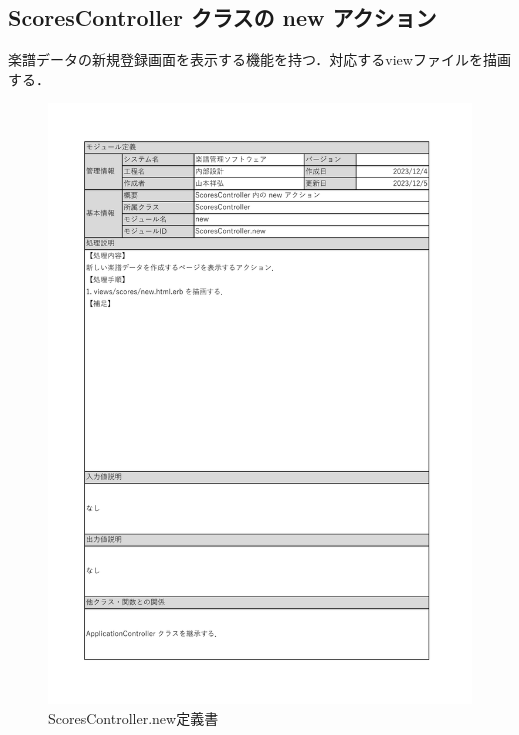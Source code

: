 \subsection*{ScoresController クラスの new アクション}
楽譜データの新規登録画面を表示する機能を持つ．対応するviewファイルを描画する．
\begin{figure}[H]
    \centering
    \includegraphics[scale=0.6]{img/Scores/xlsx/ScoresController_new.pdf}
    \vspace{-1cm}
    \caption{ScoresController.new定義書}
\end{figure}
